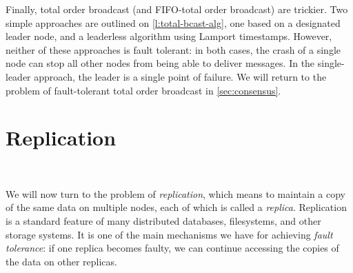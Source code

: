 Finally, total order broadcast (and FIFO-total order broadcast) are trickier.
Two simple approaches are outlined on \autoref{l:total-bcast-alg}, one based on a designated leader node, and a leaderless algorithm using Lamport timestamps.
However, neither of these approaches is fault tolerant: in both cases, the crash of a single node can stop all other nodes from being able to deliver messages.
In the single-leader approach, the leader is a single point of failure.
We will return to the problem of fault-tolerant total order broadcast in \autoref{sec:consensus}.


\section{Replication}\label{sec:replication}

\begin{frame}
    \begin{center}
        {\Large{\color{tumblue}{Replication}}} \\[2em]
        \mydetails
    \end{center}
\end{frame}

We will now turn to the problem of \emph{replication}, which means to maintain a copy of the same data on multiple nodes, each of which is called a \emph{replica}.
Replication is a standard feature of many distributed databases, filesystems, and other storage systems.
It is one of the main mechanisms we have for achieving \emph{fault tolerance}: if one replica becomes faulty, we can continue accessing the copies of the data on other replicas.


